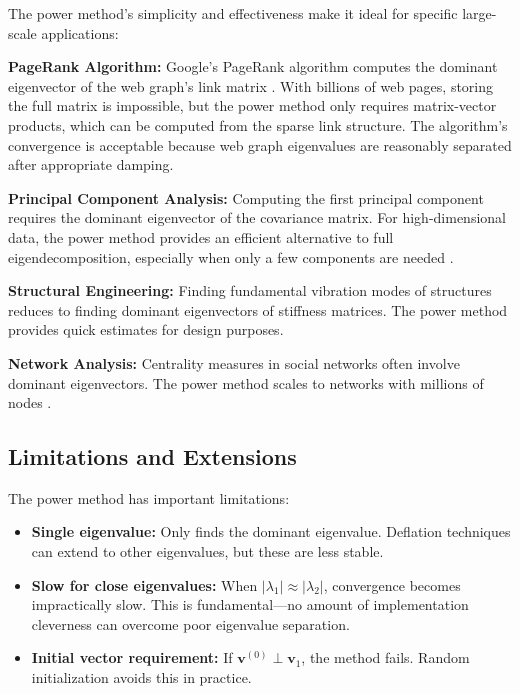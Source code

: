 \documentclass[11pt,a4paper]{article}
\begin{document}
The power method's simplicity and effectiveness make it ideal for specific large-scale applications:

\textbf{PageRank Algorithm:} Google's PageRank algorithm computes the dominant eigenvector of the web graph's link matrix \cite{pagerank}. With billions of web pages, storing the full matrix is impossible, but the power method only requires matrix-vector products, which can be computed from the sparse link structure. The algorithm's convergence is acceptable because web graph eigenvalues are reasonably separated after appropriate damping.

\textbf{Principal Component Analysis:} Computing the first principal component requires the dominant eigenvector of the covariance matrix. For high-dimensional data, the power method provides an efficient alternative to full eigendecomposition, especially when only a few components are needed \cite{golub2013}.

\textbf{Structural Engineering:} Finding fundamental vibration modes of structures reduces to finding dominant eigenvectors of stiffness matrices. The power method provides quick estimates for design purposes.

\textbf{Network Analysis:} Centrality measures in social networks often involve dominant eigenvectors. The power method scales to networks with millions of nodes \cite{saad2011}.

\subsection{Limitations and Extensions}

The power method has important limitations:
\begin{itemize}
    \item \textbf{Single eigenvalue:} Only finds the dominant eigenvalue. Deflation techniques can extend to other eigenvalues, but these are less stable.
    \item \textbf{Slow for close eigenvalues:} When $|\lambda_1| \approx |\lambda_2|$, convergence becomes impractically slow. This is fundamental---no amount of implementation cleverness can overcome poor eigenvalue separation.
    \item \textbf{Initial vector requirement:} If $\mathbf{v}^{(0)} \perp \mathbf{v}_1$, the method fails. Random initialization avoids this in practice.
\end{itemize}
\end{document}
